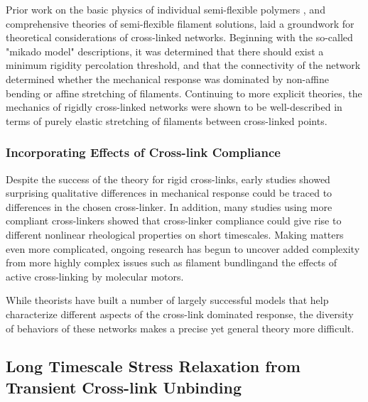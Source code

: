 \documentclass[pre,reprint]{revtex4-1}
\begin{document}
Prior work on the basic physics of individual semi-flexible polymers \cite{mol_wlc,theo_doi_ed}, and comprehensive theories of semi-flexible filament solutions, \cite{theo_morse} laid a groundwork for theoretical considerations of cross-linked networks. Beginning with the so-called "mikado model" descriptions\cite{theo_hlm,theo_hlm2}, it was determined that there should exist a minimum rigidity percolation threshold, and that the connectivity of the network determined whether the mechanical response was dominated by non-affine bending or affine stretching of filaments.   Continuing to more explicit theories\cite{theo_best}, the mechanics of rigidly cross-linked networks were shown to be well-described in terms of purely elastic stretching of filaments between cross-linked points.  

\subsubsection{Incorporating Effects of Cross-link Compliance}

Despite the success of the theory for rigid cross-links, early studies showed surprising qualitative differences in mechanical response could be traced to differences in the chosen cross-linker\cite{rheo_crosslinkcompare,rheo_crosslinkreview}.  In addition, many studies using more compliant cross-linkers showed that cross-linker compliance could give rise to different nonlinear rheological properties on short timescales\cite{rheo_crosslink_nonlin1,rheo_crosslink_nonlin2,rheo_crosslink_nonlin3,rheo_crosslink_notactin}. Making matters even more complicated, ongoing research has begun to uncover added complexity from more highly complex issues such as filament bundling\cite{theo_crosslinkslip2,model_massive}and the effects of active cross-linking by molecular motors\cite{rheo_active}.

While theorists have built a number of largely successful models that help characterize different aspects of the cross-link dominated response\cite{theo_nonaffine2,theo_floppy,theo_crosslinknonlinear}, the diversity of behaviors of these networks makes a precise yet general theory more difficult.

\subsection{Long Timescale Stress Relaxation from Transient Cross-link Unbinding}
\end{document}
